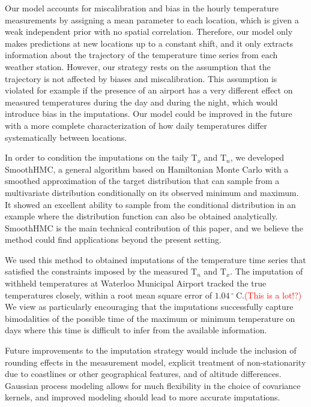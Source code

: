 \documentclass[letter]{article}
\newcommand \tcr[1]{\textcolor{red}{(#1)}}
\newcommand{\T}{\mathrm{T}}
\newcommand{\Tn}{\T_{n}}
\newcommand{\Tx}{\T_{x}}
\newcommand{\degreeC}{{}^{\circ}~\mathrm{C}}
\begin{document}
        Our model accounts for miscalibration and bias in the hourly temperature measurements by assigning a mean parameter to each location, which is given a weak independent prior with no spatial correlation.
Therefore, our model only makes predictions at new locations up to a constant shift, and it only extracts information about the trajectory of the temperature time series from each weather station.
However, our strategy rests on the assumption that the trajectory is not affected by biases and miscalibration.
This assumption is violated for example if the presence of an airport has a very different effect on measured temperatures during the day and during the night, which would introduce bias in the imputations.
Our model could be improved in the future with a more complete characterization of how daily temperatures differ systematically between locations.
    


        In order to condition the imputations on the taily \(\Tx\) and \(\Tn\), we developed SmoothHMC, a general algorithm based on Hamiltonian Monte Carlo with a smoothed approximation of the target distribution that can sample from a multivariate distribution conditionally on its observed minimum and maximum.
It showed an excellent ability to sample from the conditional distribution in an example where the distribution function can also be obtained analytically.
SmoothHMC is the main technical contribution of this paper, and we believe the method could find applications beyond the present setting.

We used this method to obtained imputations of the temperature time series that satisfied the constraints imposed by the measured \(\Tn\) and \(\Tx\).
The imputation of withheld temperatures at Waterloo Municipal Airport tracked the true temperatures closely, within a root mean square error of \(1.04\,\degreeC\).\tcr{This is a lot!?}
We view as particularly encouraging that the imputations successfully capture bimodalities of the possible time of the maximum or minimum temperature on days where this time is difficult to infer from the available information.

Future improvements to the imputation strategy would include the inclusion of rounding effects in the measurement model, explicit treatment of non-stationarity due to coastlines or other geographical features, and of altitude differences.
Gaussian process modeling allows for much flexibility in the choice of covariance kernels, and improved modeling should lead to more accurate imputations.
    
\end{document}
